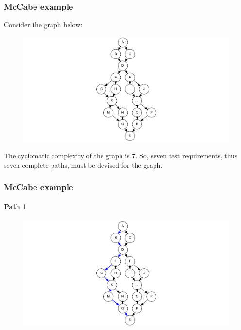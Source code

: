 \begin{frame}[hasprev=false, hasnext=true]
\frametitle{McCabe example}
\label{example:mccabe}

Consider the graph below:

\begin{figure}
	\centering
	\includegraphics[scale=.3]{aux/examples/mccabe/mccabe-example}
\end{figure}

The cyclomatic complexity of the graph is 7. So, seven test requirements,
thus seven complete paths, must be devised for the graph.
\end{frame}


\begin{frame}[c, hasprev=true, hasnext=true]
\frametitle{McCabe example}
\framesubtitle{Path 1}

\begin{figure}
	\centering
	\includegraphics[scale=.3]{aux/examples/mccabe/mccabe-example-path-1}
\end{figure}
\end{frame}



